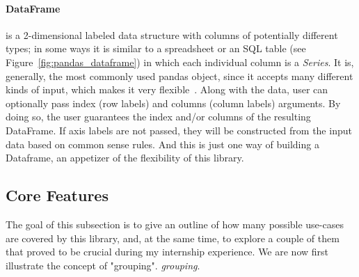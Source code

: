 \paragraph{DataFrame} is a 2-dimensional labeled data structure with columns of potentially different types; in some ways it is similar to
a spreadsheet or an SQL table (see Figure~\ref{fig:pandas_dataframe}) in which each individual column is a \textit{Series}.
It is, generally, the most commonly used pandas object, since it accepts many different kinds of input, which makes it very flexible~\cite{reback_pandas-dev/pandas:_2022}.
Along with the data, user
can optionally pass index (row labels) and columns (column labels) arguments. By doing so, the user guarantees the index and/or columns of the resulting DataFrame.
If axis labels are not passed, they will be constructed from the input data based on common sense rules.
And this is just one way of building a Dataframe, an appetizer of the flexibility of this library.

\subsection{Core Features}
The goal
of this subsection is to give an outline of how many possible use-cases are covered by this library, and, at the same time, to explore a couple of them that proved to be crucial during my internship experience.
We are now first illustrate the concept of "grouping". \textit{grouping}.

